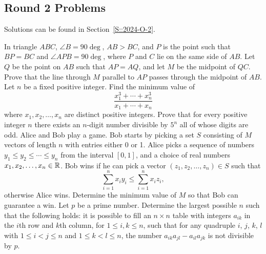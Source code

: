 \clearpage
\subsection{Round 2 Problems}
Solutions can be found in Section~\ref{S::2024-O-2}.

\begin{enumerate}
    \hyperrefitem[A::2024-O-2-1] In triangle $ABC$, $\angle B = 90\deg$, $AB > BC$, and $P$ is the point such that $BP = BC$ and $\angle APB = 90\deg$, where $P$ and $C$ lie on the same side of $AB$. Let $Q$ be the point on $AB$ such that $AP = AQ$, and let $M$ be the midpoint of $QC$. Prove that the line through $M$ parallel to $AP$ passes through the midpoint of $AB$.
    \hyperrefitem[A::2024-O-2-2] Let $n$ be a fixed positive integer. Find the minimum value of \[\frac{x_1^3 + \cdots + x_n^3}{x_1 + \cdots + x_n}\] where $x_1, x_2, \ldots, x_n$ are distinct positive integers.
    \hyperrefitem[A::2024-O-2-3] Prove that for every positive integer $n$ there exists an $n$-digit number divisible by $5^n$ all of whose digits are odd.
    \hyperrefitem[A::2024-O-2-4]Alice and Bob play a game. Bob starts by picking a set $S$ consisting of $M$ vectors of length $n$ with entries either 0 or 1. Alice picks a sequence of numbers $y_1 \leq y_2 \leq \cdots \leq y_n$ from the interval $[0, 1]$, and a choice of real numbers $x_1, x_2, \ldots, x_n \in \mathbb{R}$. Bob wins if he can pick a vector $(z_1, z_2, \ldots, z_n) \in S$ such that \[\sum_{i=1}^n x_i y_i \leq \sum_{i=1}^n x_i z_i,\] otherwise Alice wins. Determine the minimum value of $M$ so that Bob can guarantee a win.
    \hyperrefitem[A::2024-O-2-5] Let $p$ be a prime number. Determine the largest possible $n$ such that the following holds: it is possible to fill an $n \times n$ table with integers $a_{ik}$ in the $i$th row and $k$th column, for $1 \leq i, k \leq n$, such that for any quadruple $i$, $j$, $k$, $l$ with $1 \leq i < j \leq n$ and $1 \leq k < l \leq n$, the number $a_{ik}a_{jl} - a_{il}a_{jk}$ is not divisible by $p$.
\end{enumerate}

